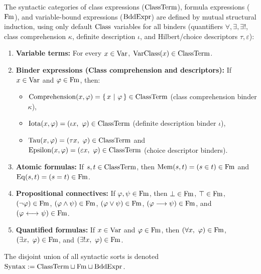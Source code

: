 \begin{definition}
\label{def:mutual_ast_terms_formulas}
The syntactic categories of class expressions (${\text{ClassTerm}}$), formula expressions ($\mathrm{Fm}$), and variable-bound expressions ($\mathrm{BddExpr}$) are defined by mutual structural induction, using only default ${\text{Class}}$ variables for all binders (quantifiers $\forall, \exists, \exists!$, class comprehension $\kappa$, definite description $\iota$, and Hilbert/choice descriptors $\tau, \varepsilon$):
\begin{enumerate}
\item \textbf{Variable terms:} For every $x \in \mathrm{Var}$, $\mathrm{VarClass}(x) \in {\text{ClassTerm}}$.
\item \textbf{Binder expressions (Class comprehension and descriptors):} If $x \in \mathrm{Var}$ and $\varphi \in \mathrm{Fm}$, then:
  \begin{itemize}
  \item $\mathrm{Comprehension}(x, \varphi) = \left\{\,x\ \middle|\ \varphi\,\right\} \in {\text{ClassTerm}}$ (class comprehension binder $\kappa$),
  \item $\mathrm{Iota}(x, \varphi) = (\iota x,\ \varphi) \in \ClassTerm$ (definite description binder $\iota$),
  \item $\mathrm{Tau}(x, \varphi) = (\tau x,\ \varphi) \in \ClassTerm$ and $\mathrm{Epsilon}(x, \varphi) = (\varepsilon x,\ \varphi) \in \ClassTerm$ (choice descriptor binders).
  \end{itemize}
\item \textbf{Atomic formulas:} If $s, t \in {\text{ClassTerm}}$, then $\mathrm{Mem}(s, t) = (s \in t) \in \mathrm{Fm}$ and $\mathrm{Eq}(s, t) = (s = t) \in \mathrm{Fm}$.
\item \textbf{Propositional connectives:} If $\varphi, \psi \in \mathrm{Fm}$, then $\bot \in \mathrm{Fm}$, $\top \in \mathrm{Fm}$, $(\lnot \varphi) \in \mathrm{Fm}$, $(\varphi \land \psi) \in \mathrm{Fm}$, $(\varphi \lor \psi) \in \mathrm{Fm}$, $(\varphi \longrightarrow \psi) \in \mathrm{Fm}$, and $(\varphi {\ \longleftrightarrow\ } \psi) \in \mathrm{Fm}$.
\item \textbf{Quantified formulas:} If $x \in \mathrm{Var}$ and $\varphi \in \mathrm{Fm}$, then $(\forall x,\ \varphi) \in \mathrm{Fm}$, $(\exists x,\ \varphi) \in \mathrm{Fm}$, and $(\exists! x,\ \varphi) \in \mathrm{Fm}$.
\end{enumerate}
The disjoint union of all syntactic sorts is denoted $\mathrm{Syntax} := {\text{ClassTerm}} \sqcup \mathrm{Fm} \sqcup \mathrm{BddExpr}$.
\end{definition}

